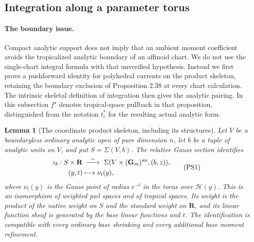 \documentclass[11pt]{article}
\newtheorem{lemma}[theorem]{Lemma}
\theoremstyle{definition}
\theoremstyle{remark}
\numberwithin{equation}{section}
\begin{document}
\subsection{Integration along a parameter torus}

\paragraph{The boundary issue.}
Compact analytic support does not imply that an ambient moment
coefficient avoids the tropicalized analytic boundary of an affinoid
chart.  We do not use the single-chart integral formula with that
unverified hypothesis.  Instead we first prove a pushforward identity
for polyhedral currents on the product skeleton, retaining the boundary
exclusion of Proposition 2.38 at every chart calculation.  The
intrinsic skeletal definition of integration then gives the analytic
pairing.  In this subsection $f^\star$ denotes tropical-space pullback
in that proposition, distinguished from the notation $t_c^*$ for the
resulting actual analytic form.

\begin{lemma}[The coordinate product skeleton, including its structures]
\label{r11p:coordinate-product-skeleton}
Let $V$ be a boundaryless ordinary analytic open of pure dimension $n$,
let $b$ be a tuple of analytic units on $V$, and put $S=\Sigma(V,b)$.
The relative Gauss section identifies
\[
 \begin{split}
 \iota_b:S\times\mathbf R&\ \xrightarrow{\ \sim\ }\
       \Sigma(V\times(\mathbf G_m)^{\rm an},(b,z)),\\
                  (y,t)&\longmapsto \nu_t(y),
 \end{split}
\tag{PS1}\label{r11p:product-skeleton-identity}
\]
where $\nu_t(y)$ is the Gauss point of radius $e^{-t}$ in the torus
over $\mathcal H(y)$.  This is an isomorphism of weighted pwl spaces
and of tropical spaces.  Its weight is the product of the native
weight on $S$ and the standard weight on $\mathbf R$, and its linear
function sheaf is generated by the base linear functions and $t$.
The identification is compatible with every ordinary base shrinking
and every additional base moment refinement.
\end{lemma}
\end{document}
